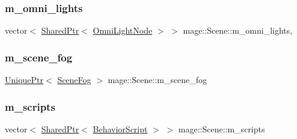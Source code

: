 \subsubsection{\texorpdfstring{m\+\_\+omni\+\_\+lights}{m\_omni\_lights}}
{\footnotesize\ttfamily vector$<$ \hyperlink{namespacemage_a1e01ae66713838a7a67d30e44c67703e}{Shared\+Ptr}$<$ \hyperlink{namespacemage_a1724c6e6b6b5ba535cdd967cbbb4a669}{Omni\+Light\+Node} $>$ $>$ mage\+::\+Scene\+::m\+\_\+omni\+\_\+lights\hspace{0.3cm}{\ttfamily [mutable]}, {\ttfamily [private]}}

\hypertarget{classmage_1_1_scene_a58f8d29322664c4c5895703a6cbc9000}{}\label{classmage_1_1_scene_a58f8d29322664c4c5895703a6cbc9000} 
\subsubsection{\texorpdfstring{m\+\_\+scene\+\_\+fog}{m\_scene\_fog}}
{\footnotesize\ttfamily \hyperlink{namespacemage_a3316d7143a973e37adf1110f2e80ca31}{Unique\+Ptr}$<$ \hyperlink{structmage_1_1_scene_fog}{Scene\+Fog} $>$ mage\+::\+Scene\+::m\+\_\+scene\+\_\+fog\hspace{0.3cm}{\ttfamily [private]}}

\hypertarget{classmage_1_1_scene_a84548bf6978f8955ce5892cb23536a4e}{}\label{classmage_1_1_scene_a84548bf6978f8955ce5892cb23536a4e} 
\subsubsection{\texorpdfstring{m\+\_\+scripts}{m\_scripts}}
{\footnotesize\ttfamily vector$<$ \hyperlink{namespacemage_a1e01ae66713838a7a67d30e44c67703e}{Shared\+Ptr}$<$ \hyperlink{classmage_1_1_behavior_script}{Behavior\+Script} $>$ $>$ mage\+::\+Scene\+::m\+\_\+scripts\hspace{0.3cm}{\ttfamily [private]}}

\hypertarget{classmage_1_1_scene_a4e1954bc0b812d6a71123ca3ac9eeb75}{}\label{classmage_1_1_scene_a4e1954bc0b812d6a71123ca3ac9eeb75} 
